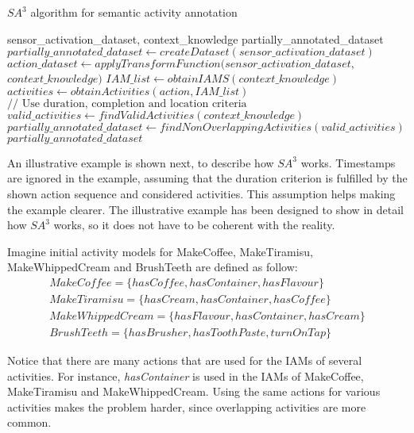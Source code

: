 \begin{algorithm}
 \caption{$SA^3$ algorithm for semantic activity annotation}
 \label{alg:sa3}
 \begin{algorithmic}
 \REQUIRE sensor\_activation\_dataset, context\_knowledge
 \ENSURE partially\_annotated\_dataset
 \STATE $partially\_annotated\_dataset \leftarrow createDataset(sensor\_activation\_dataset)$
 \STATE $action\_dataset \leftarrow applyTransformFunction(sensor\_activation\_dataset,$ 
 $context\_knowledge)$
 \STATE $IAM\_list \leftarrow obtainIAMS(context\_knowledge)$
    \STATE $activities \leftarrow obtainActivities(action, IAM\_list)$
  \ENDIF
    \STATE $// \text{ Use duration, completion and location criteria}$
    \STATE $valid\_activities \leftarrow findValidActivities(context\_knowledge)$
  \ENDFOR
 \ENDFOR
 \STATE $partially\_annotated\_dataset \leftarrow findNonOverlappingActivities(valid\_activities)$
 \RETURN $partially\_annotated\_dataset$
 \end{algorithmic}
\end{algorithm}

An illustrative example is shown next, to describe how $SA^3$ works. Timestamps are ignored in the example, assuming that the duration criterion is fulfilled by the shown action sequence and considered activities. This assumption helps making the example clearer. The illustrative example has been designed to show in detail how $SA^3$ works, so it does not have to be coherent with the reality. 

Imagine initial activity models for MakeCoffee, MakeTiramisu, MakeWhippedCream and BrushTeeth are defined as follow:
 \begin{equation*}
  \begin{split}
  MakeCof\!fee =\{hasCof\!fee, hasContainer, hasFlavour\} \\
  MakeTiramisu = \{hasCream, hasContainer, hasCof\!fee\} \\
  MakeWhippedCream = \{hasFlavour, hasContainer, hasCream\} \\
  BrushTeeth = \{hasBrusher, hasToothPaste, turnOnTap\} 
  \end{split}
 \end{equation*} 
 
Notice that there are many actions that are used for the IAMs of several activities. For instance, \textit{hasContainer} is used in the IAMs of MakeCoffee, MakeTiramisu and MakeWhippedCream. Using the same actions for various activities makes the problem harder, since overlapping activities are more common.

